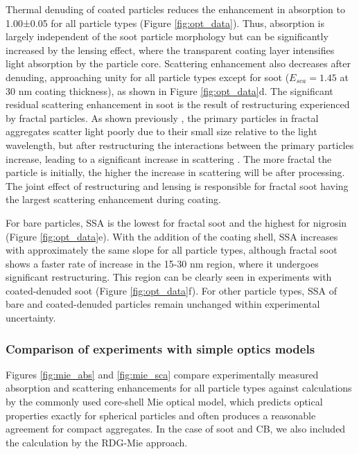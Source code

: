 Thermal denuding of coated particles reduces the enhancement in absorption to 1.00±0.05 for all particle types (Figure \ref{fig:opt_data}). Thus, absorption is largely independent of the soot particle morphology but can be significantly increased by the lensing effect, where the transparent coating layer intensifies light absorption by the particle core.
Scattering enhancement also decreases after denuding, approaching unity for all particle types except for soot ($E_{sca} = 1.45$ at 30 nm coating thickness), as shown in Figure \ref{fig:opt_data}d. The significant residual scattering enhancement in soot is the result of restructuring experienced by fractal particles. As shown previously \citep{RN40}, the primary particles in fractal aggregates scatter light poorly due to their small size relative to the light wavelength, but after restructuring the interactions between the primary particles increase, leading to a significant increase in scattering \citep{RN7}. The more fractal the particle is initially, the higher the increase in scattering will be after processing. The joint effect of restructuring and lensing is responsible for fractal soot having the largest scattering enhancement during coating.

For bare particles, SSA is the lowest for fractal soot and the highest for nigrosin (Figure \ref{fig:opt_data}e). With the addition of the coating shell, SSA increases with approximately the same slope for all particle types, although fractal soot shows a faster rate of increase in the 15-30 nm region, where it undergoes significant restructuring. This region can be clearly seen in experiments with coated-denuded soot (Figure \ref{fig:opt_data}f). For other particle types, SSA of bare and coated-denuded particles remain unchanged within experimental uncertainty.


\subsubsection{Comparison of experiments with simple optics models}

Figures \ref{fig:mie_abs} and \ref{fig:mie_sca} compare experimentally measured absorption and scattering enhancements for all particle types against calculations by the commonly used core-shell Mie optical model, which predicts optical properties exactly for spherical particles and often produces a reasonable agreement for compact aggregates. In the case of soot and CB, we also included the calculation by the RDG-Mie approach.

